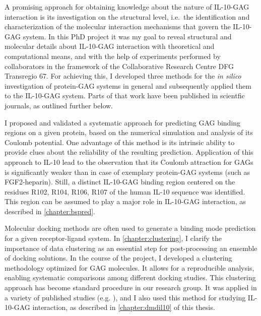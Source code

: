 A promising approach for obtaining knowledge about the nature of IL-10-GAG
interaction is its investigation on the structural level, i.e.\ the
identification and characterization of the molecular interaction mechanisms that
govern the IL-10-GAG system. In this PhD project it was my goal to reveal
structural and molecular details about IL-10-GAG interaction with theoretical
and computational means, and with the help of experiments performed by
collaborators in the framework of the Collaborative Research Centre DFG
Transregio 67. For achieving this, I developed three methods for the
\textit{in silico} investigation of protein-GAG systems in general and
subsequently applied them to the IL-10-GAG system. Parts of that work have been
published in scientfic journals, as outlined further below.

I proposed and validated a systematic approach for predicting GAG binding
regions on a given protein, based on the numerical simulation and analysis of
its Coulomb potential. One advantage of this method is its intrinsic ability to
provide clues about the reliability of the resulting prediction. Application of
this approach to IL-10 lead to the observation that its Coulomb attraction for
GAGs is significantly weaker than in case of exemplary protein-GAG systems (such
as FGF2-heparin). Still, a distinct IL-10-GAG binding region centered on the
residues R102, R104, R106, R107 of the human IL-10 sequence was identified. This
region can be assumed to play a major role in IL-10-GAG interaction, as
described in \cref{chapter:bspred}.

Molecular docking methods are often used to generate a binding mode prediction
for a given receptor-ligand system. In \cref{chapter:clustering}, I clarify the
importance of data clustering as an essential step for post-processing an
ensemble of docking solutions. In the course of the project, I developed a
clustering methodology optimized for GAG molecules. It allows for a reproducible
analysis, enabling systematic comparisons among different docking studies. This
clustering approach has become standard procedure in our research group. It was
applied in a variety of published studies (e.g. \cite{franz_cathepsin_2013}),
and I also used this method for studying IL-10-GAG interaction, as described in
\cref{chapter:dmdil10} of this thesis.

